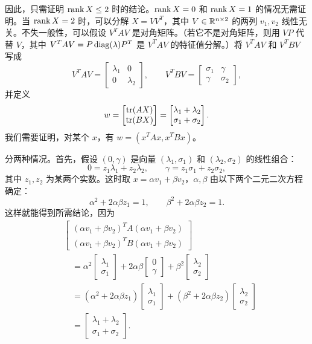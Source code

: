 因此，只需证明 $\operatorname{rank} X\leq2$ 时的结论。$\operatorname{rank} X=0$ 和 $\operatorname{rank} X=1$ 的情况无需证明。当 $\operatorname{rank} X=2$ 时，可以分解 $X=VV^T$，其中 $V\in\mathbb R^{n\times2}$ 的两列 $v_1,v_2$ 线性无关。不失一般性，可以假设 $V^TAV$ 是对角矩阵。（若它不是对角矩阵，则用 $VP$ 代替 $V$，其中 $V^TAV=P\operatorname{diag}(\lambda)P^T$ 是 $V^TAV$ 的特征值分解。）将 $V^TAV$ 和 $V^TBV$ 写成
\[
 V^TAV=\begin{bmatrix}\lambda_1&0\\0&\lambda_2\end{bmatrix},\qquad
 V^TBV=\begin{bmatrix}\sigma_1&\gamma\\\gamma&\sigma_2\end{bmatrix},
\]
并定义
\[
 w=\begin{bmatrix}\operatorname{tr}(AX)\\\operatorname{tr}(BX)\end{bmatrix}
 =\begin{bmatrix}\lambda_1+\lambda_2\\\sigma_1+\sigma_2\end{bmatrix}.
\]
我们需要证明，对某个 $x$，有 $w=(x^TAx,x^TBx)$。

分两种情况。首先，假设 $(0,\gamma)$ 是向量 $(\lambda_1,\sigma_1)$ 和 $(\lambda_2,\sigma_2)$ 的线性组合：
\[
 0=z_1\lambda_1+z_2\lambda_2,\qquad
 \gamma=z_1\sigma_1+z_2\sigma_2,
\]
其中 $z_1,z_2$ 为某两个实数。这时取 $x=\alpha v_1+\beta v_2$，$\alpha,\beta$ 由以下两个二元二次方程确定：
\begin{equation}
 \alpha^2+2\alpha\beta z_1=1,\qquad
 \beta^2+2\alpha\beta z_2=1.\tag{B.9}
\end{equation}
这样就能得到所需结论，因为
\begin{align*}
 &\begin{bmatrix}
 (\alpha v_1+\beta v_2)^TA(\alpha v_1+\beta v_2)\\
 (\alpha v_1+\beta v_2)^TB(\alpha v_1+\beta v_2)
 \end{bmatrix}\\
 &\quad=\alpha^2\begin{bmatrix}\lambda_1\\\sigma_1\end{bmatrix}
 +2\alpha\beta\begin{bmatrix}0\\\gamma\end{bmatrix}
 +\beta^2\begin{bmatrix}\lambda_2\\\sigma_2\end{bmatrix}\\
 &\quad=(\alpha^2+2\alpha\beta z_1)\begin{bmatrix}\lambda_1\\\sigma_1\end{bmatrix}
 +(\beta^2+2\alpha\beta z_2)\begin{bmatrix}\lambda_2\\\sigma_2\end{bmatrix}\\
 &\quad=\begin{bmatrix}\lambda_1+\lambda_2\\\sigma_1+\sigma_2\end{bmatrix}.
\end{align*}

